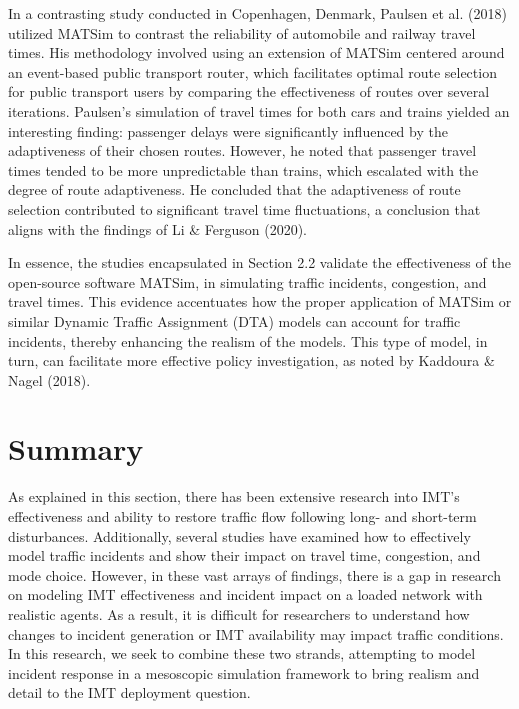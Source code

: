 \documentclass[fancy, oneside, mastersfancy, ms]{byuthesis}
\begin{document}
In a contrasting study conducted in Copenhagen, Denmark, Paulsen et al.
(2018) utilized MATSim to contrast the reliability of automobile and
railway travel times. His methodology involved using an extension of
MATSim centered around an event-based public transport router, which
facilitates optimal route selection for public transport users by
comparing the effectiveness of routes over several iterations. Paulsen's
simulation of travel times for both cars and trains yielded an
interesting finding: passenger delays were significantly influenced by
the adaptiveness of their chosen routes. However, he noted that
passenger travel times tended to be more unpredictable than trains,
which escalated with the degree of route adaptiveness. He concluded that
the adaptiveness of route selection contributed to significant travel
time fluctuations, a conclusion that aligns with the findings of Li \&
Ferguson (2020).

In essence, the studies encapsulated in Section 2.2 validate the
effectiveness of the open-source software MATSim, in simulating traffic
incidents, congestion, and travel times. This evidence accentuates how
the proper application of MATSim or similar Dynamic Traffic Assignment
(DTA) models can account for traffic incidents, thereby enhancing the
realism of the models. This type of model, in turn, can facilitate more
effective policy investigation, as noted by Kaddoura \& Nagel (2018).

\hypertarget{summary}{%
\section{Summary}\label{summary}}

As explained in this section, there has been extensive research into
IMT's effectiveness and ability to restore traffic flow following long-
and short-term disturbances. Additionally, several studies have examined
how to effectively model traffic incidents and show their impact on
travel time, congestion, and mode choice. However, in these vast arrays
of findings, there is a gap in research on modeling IMT effectiveness
and incident impact on a loaded network with realistic agents. As a
result, it is difficult for researchers to understand how changes to
incident generation or IMT availability may impact traffic conditions.
In this research, we seek to combine these two strands, attempting to
model incident response in a mesoscopic simulation framework to bring
realism and detail to the IMT deployment question.
\end{document}
